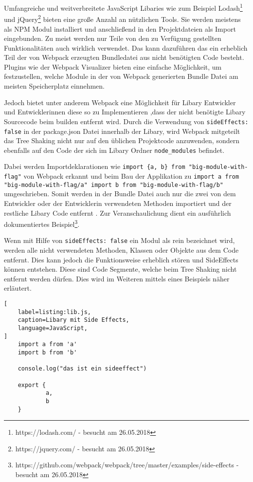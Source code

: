 Umfangreiche und weitverbreitete JavaScript Libaries wie zum Beispiel Lodash\footnote{https://lodash.com/ - besucht am 26.05.2018} und jQuery\footnote{https://jquery.com/ - besucht am 26.05.2018} bieten eine große Anzahl an nützlichen Tools. Sie werden meistens als NPM Modul installiert und anschließend in den Projektdateien als Import eingebunden. Zu meist werden nur Teile von den zu Verfügung gestellten Funktionalitäten auch wirklich verwendet. Das kann dazuführen das ein erheblich Teil der von Webpack erzeugten Bundledatei aus nicht benötigten Code besteht. Plugins wie der Webpack Visualizer bieten eine einfache Möglichkeit, um festzustellen, welche Module in der von Webpack generierten Bundle Datei am meisten Speicherplatz einnehmen.

Jedoch bietet unter anderem Webpack eine Möglichkeit für Libary Entwickler und Entwicklerinnen diese so zu Implementieren ,dass der nicht benötigte Libary Sourcecode beim builden entfernt wird.
Durch die Verwendung von \lstinline{sideEffects: false} in der package.json Datei innerhalb der Libary, wird Webpack mitgeteilt das Tree Shaking nicht nur auf den üblichen Projektcode anzuwenden, sondern ebenfalls auf den Code der sich im Libary Ordner \lstinline{node_modules} befindet.

Dabei werden Importdeklarationen wie \lstinline|import {a, b} from "big-module-with-flag"| von Webpack erkannt und beim Bau der Applikation zu \lstinline|import a from "big-module-with-flag/a" import b from "big-module-with-flag/b"| umgeschrieben. Somit werden in der Bundle Datei auch nur die zwei von dem Entwickler oder der Entwicklerin verwendeten Methoden importiert und der restliche Libary Code entfernt \autocite{WebpackTreeShaking}. Zur Veranschaulichung dient ein ausführlich dokumentiertes Beispiel\footnote{https://github.com/webpack/webpack/tree/master/examples/side-effects - besucht am 26.05.2018}. 

Wenn mit Hilfe von \lstinline{sideEffects: false} ein Modul als rein bezeichnet wird, werden alle nicht verwendeten Methoden, Klassen oder Objekte aus dem Code entfernt. Dies kann jedoch die Funktionsweise erheblich stören und SideEffects können entstehen. Diese sind Code Segmente, welche beim Tree Shaking nicht entfernt werden dürfen. Dies wird im Weiteren mittels eines Beispiels näher erläutert.

\begin{lstlisting}[
    label=listing:lib.js,
	caption=Libary mit Side Effects,
	language=JavaScript,
]
	import a from 'a'
    import b from 'b'
    
    console.log("das ist ein sideeffect")
    
    export {
    		a,
    		b
    }
\end{lstlisting}

